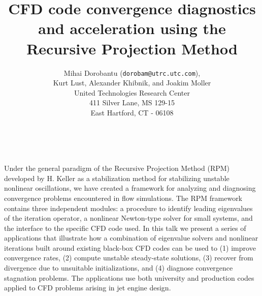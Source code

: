 \documentclass[11pt]{article}
\date{ ~ \hspace{-4mm}}
\title{CFD code convergence diagnostics and acceleration using the Recursive Projection Method  }
\author{Mihai Dorobantu ({\tt dorobam@utrc.utc.com}), \\ Kurt Lust, Alexander Khibnik, and Joakim Moller \\ United Technologies Research Center  \\  411 Silver Lane, MS 129-15  \\  East Hartford, CT - 06108}
\begin{document}
\maketitle
\thispagestyle{empty}






Under the general paradigm of the Recursive Projection Method (RPM) developed by H.
Keller as a stabilization method for stabilizing unstable nonlinear oscillations, we have
created a framework for analyzing and diagnosing convergence problems encountered in flow
simulations. The RPM framework contains three independent modules: a procedure to identify
leading eigenvalues of the iteration operator, a nonlinear Newton-type solver for small
systems, and the interface to the specific CFD code used. In this talk we present a series
of applications that illustrate how a combination of eigenvalue solvers and nonlinear
iterations built around existing black-box CFD codes can be used to (1) improve
convergence rates, (2) compute unstable steady-state solutions, (3) recover from
divergence due to unsuitable initializations, and (4) diagnose convergence stagnation
problems. The applications use both university and production codes applied to CFD
problems arising in jet engine design. 
\end{document}
